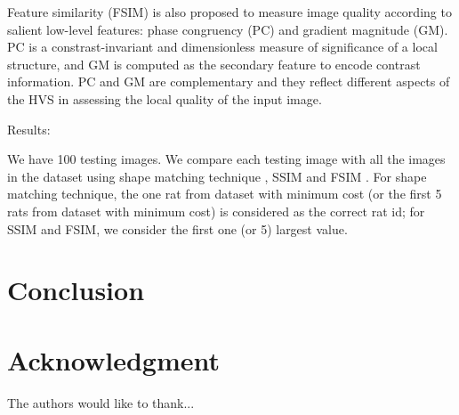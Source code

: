 \documentclass[conference,10pt,times,letter]{IEEEtran}
\begin{document}
Feature similarity (FSIM) \cite{zhang2011fsim} is also proposed to measure image quality according to salient low-level features: phase congruency (PC) and gradient magnitude (GM). PC is a constrast-invariant and dimensionless measure of significance of a local structure, and GM is computed as the secondary feature to encode contrast information. PC and GM are complementary and they reflect different aspects of the HVS in assessing the local quality of the input image. 


Results:

We have 100 testing images. We compare each testing image with all the images in the dataset using shape matching technique \cite{belongie2002shape}, SSIM \cite{wang2004image} and FSIM \cite{zhang2011fsim}. For shape matching technique, the one rat from dataset with minimum cost (or the first 5 rats from dataset with minimum cost) is considered as the correct rat id; for SSIM and FSIM, we consider the first one (or 5) largest value.

\section{Conclusion}
\label{sec:conclusion}





\section*{Acknowledgment}


The authors would like to thank...


\ifCLASSOPTIONcaptionsoff
  \newpage
\fi





\end{document}
